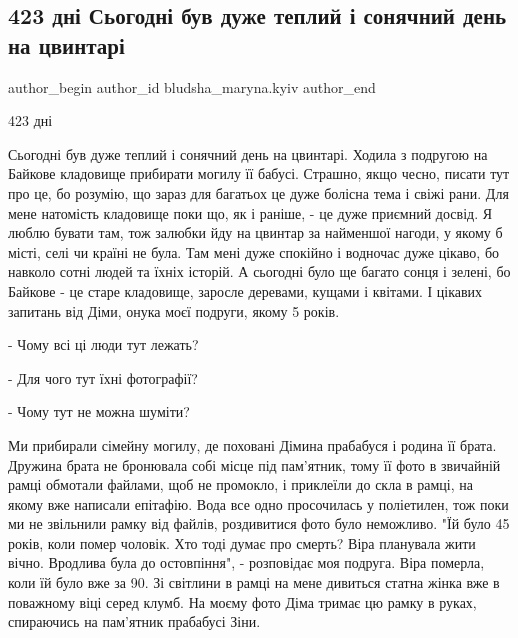  
 
 
 
 

\subsection{423 дні Сьогодні був дуже теплий і сонячний день на цвинтарі}
\label{sec:23_04_2023.fb.bludsha_maryna.kyiv.1.423_teplyj_sonechnyj_den_cvyntar_bajkove}

\ifcmt
 author_begin
   author_id bludsha_maryna.kyiv
 author_end
\fi

423 дні

Сьогодні був дуже теплий і сонячний день на цвинтарі. Ходила з подругою на
Байкове кладовище прибирати могилу її бабусі. Страшно, якщо чесно, писати тут
про це, бо розумію, що зараз для багатьох це дуже болісна тема і свіжі рани.
Для мене натомість кладовище поки що, як і раніше, - це дуже приємний досвід. Я
люблю бувати там, тож залюбки йду на цвинтар за найменшої нагоди, у якому б
місті, селі чи країні не була. Там мені дуже спокійно і водночас дуже цікаво,
бо навколо сотні людей та їхніх історій. А сьогодні було ще багато сонця і
зелені, бо Байкове - це старе кладовище, заросле деревами, кущами і квітами. І
цікавих запитань від Діми, онука моєї подруги, якому 5 років.

- Чому всі ці люди тут лежать?

- Для чого тут їхні фотографії?

- Чому тут не можна шуміти?

Ми прибирали сімейну могилу, де поховані Дімина прабабуся і родина її брата.
Дружина брата не бронювала собі місце під пам'ятник, тому її фото в звичайній
рамці обмотали файлами, щоб не промокло, і приклеїли до скла в рамці, на якому
вже написали епітафію. Вода все одно просочилась у поліетилен, тож поки ми не
звільнили рамку від файлів, роздивитися фото було неможливо. "Їй було 45 років,
коли помер чоловік. Хто тоді думає про смерть? Віра планувала жити вічно.
Вродлива була до остовпіння", - розповідає моя подруга. Віра померла, коли їй
було вже за 90. Зі світлини в рамці на мене дивиться статна жінка вже в
поважному віці серед клумб. На моєму фото Діма тримає цю рамку в руках,
спираючись на пам'ятник прабабусі Зіни.

